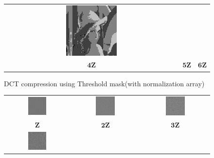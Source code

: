 \documentclass[11pt,a4paper]{article}
\begin{document}
\begin{figure}[!htbp]
\begin{tabular}{ccc}
		\includegraphics[width=0.3\textwidth]{pro7/dct/8_31_f}\\
		$\mathbf{4Z}$& $\mathbf{5Z}$ & $\mathbf{6Z}$
	\end{tabular}
	\caption{DCT compression using Threshold mask(with normalization array)}
	\label{pro7_fig2}
\end{figure}

\begin{figure}[!htbp]
	\centering
	\begin{tabular}{ccc} 
		\includegraphics[width=0.3\textwidth]{pro7/dct/8_31_a_diff}&
		\includegraphics[width=0.3\textwidth]{pro7/dct/8_31_b_diff}&
		\includegraphics[width=0.3\textwidth]{pro7/dct/8_31_c_diff}\\
		 $\mathbf{Z}$& $\mathbf{2Z}$ & $\mathbf{3Z}$\\
		\includegraphics[width=0.3\textwidth]{pro7/dct/8_31_d_diff}&

\end{tabular}
\end{figure}
\end{document}
